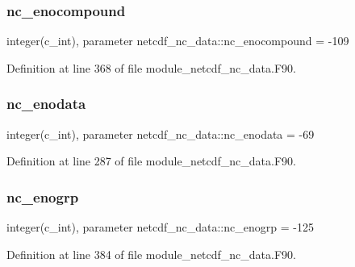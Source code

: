 \subsubsection{\texorpdfstring{nc\+\_\+enocompound}{nc\_enocompound}}
{\footnotesize\ttfamily integer(c\+\_\+int), parameter netcdf\+\_\+nc\+\_\+data\+::nc\+\_\+enocompound = -\/109}



Definition at line 368 of file module\+\_\+netcdf\+\_\+nc\+\_\+data.\+F90.

\mbox{\label{namespacenetcdf__nc__data_a09e4229d656b07b898b8df41c179bdfb}} 
\subsubsection{\texorpdfstring{nc\+\_\+enodata}{nc\_enodata}}
{\footnotesize\ttfamily integer(c\+\_\+int), parameter netcdf\+\_\+nc\+\_\+data\+::nc\+\_\+enodata = -\/69}



Definition at line 287 of file module\+\_\+netcdf\+\_\+nc\+\_\+data.\+F90.

\mbox{\label{namespacenetcdf__nc__data_a9bc185173e0b07302a0998fe5fb7950e}} 
\subsubsection{\texorpdfstring{nc\+\_\+enogrp}{nc\_enogrp}}
{\footnotesize\ttfamily integer(c\+\_\+int), parameter netcdf\+\_\+nc\+\_\+data\+::nc\+\_\+enogrp = -\/125}



Definition at line 384 of file module\+\_\+netcdf\+\_\+nc\+\_\+data.\+F90.

\mbox{\label{namespacenetcdf__nc__data_a80cce55761ff64b987641fe6f2e05821}} 

